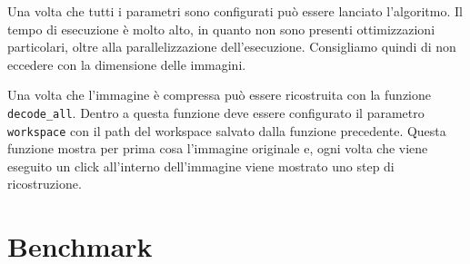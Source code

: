 \documentclass[11pt,a4paper,appendixprefix=true,numbers=noenddot]{scrreprt}
\begin{document}
Una volta che tutti i parametri sono configurati può essere lanciato l'algoritmo. Il tempo di esecuzione è molto alto, in quanto non sono presenti ottimizzazioni particolari, oltre alla parallelizzazione dell'esecuzione. Consigliamo quindi di non eccedere con la dimensione delle immagini.

Una volta che l'immagine è compressa può essere ricostruita con la funzione \texttt{decode\_all}. Dentro a questa funzione deve essere configurato il parametro \texttt{workspace} con il path del workspace salvato dalla funzione precedente. Questa funzione mostra per prima cosa l'immagine originale e, ogni volta che viene eseguito un click all'interno dell'immagine viene mostrato uno step di ricostruzione.

\section{Benchmark}



 
\end{document}
